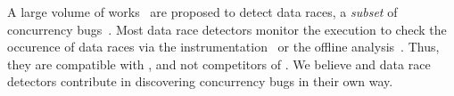%
A large volume of works~\cite{pacer, datacollider, hybridchecker,
  literace, helgrind, frost, prorace, tsan, kcsan, txrace} are
proposed to detect data races, a \textit{subset} of concurrency
bugs~\cite{lkmm, linuxmemorymodel}.
%
Most data race detectors monitor the execution to check the occurence
of data races via the instrumentation~\cite{tsan, kcsan, helgrind} or
the offline analysis~\cite{krace}. Thus, they are compatible with
\sys, and not competitors of \sys.
%
We believe \sys and data race detectors contribute in discovering
concurrency bugs in their own way.





